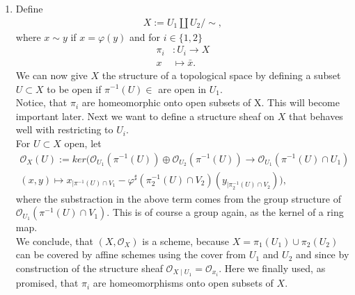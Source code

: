 \begin{exercise}{1}
    \begin{enumerate}
        \item Define 
        \begin{align*}
            X:=U_1\coprod U_2/\!{\sim},
        \end{align*}
        where $x\sim y$ if $x=\varphi(y)$ and for $i\in \lbrace
        1,2\rbrace$
        \begin{align*}
            \pi_i&:U_i\to X\\
            x&\mapsto \bar{x}.
        \end{align*}
        We can now give $X$ the structure of a topological 
        space by defining a subset $U\subset X$ to be open
        if $\pi^{-1}(U)\in$ are open in $U_1$.\\
        Notice, that $\pi_i$ are homeomorphic onto open subsets
        of X. This will become important later.
        Next we want to define a structure sheaf on $X$ that
        behaves well with restricting to $U_i.$\\
        For $U\subset X$ open, let 
        \begin{align*}
            \mathcal{O}_X(U):=ker(\mathcal{O}_{U_1}(\pi^{-1}(U))\oplus \mathcal{O}_{U_2}(\pi^{-1}(U)) \to \mathcal{O}_{U_1}(\pi^{-1}(U) \cap U_1)\\
            (x,y) \mapsto x_{\mid \pi^{-1}(U)\cap V_1}-\varphi^\sharp (\pi_2^{-1}(U)\cap V_2)(y_{\mid \pi_2^{-1}(U)\cap V_2})),
        \end{align*}
            where the substraction in the above term comes from the group
            structure of $\mathcal{O}_{U_1}(\pi^{-1}(U)\cap V_1)$. This is of course
            a group again, as the kernel of a ring map.\\
            We conclude, that $(X,\mathcal{O}_X)$ is a scheme, because 
            $X=\pi_1(U_1)\cup \pi _2(U_2)$  can be covered by affine
            schemes using the cover from $U_1$ and $U_2$ and since by construction
            of the structure sheaf $\mathcal{O}_{X \mid U_1}=\mathcal{O}_{x_i}.$
            Here we finally used, as promised, that $\pi_i$ are homeomorphisms
            onto open subsets of $X$.
    \end{enumerate}
   
\end{exercise}

